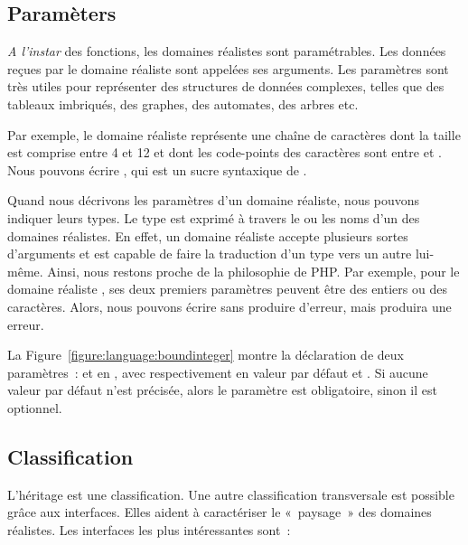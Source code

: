\subsection{Paramèters}
\label{subsection:language:realdom:parameters}

{\em A l'instar} des fonctions, les domaines réalistes sont {\strong
paramétrables}.  Les données reçues par le domaine réaliste sont appelées ses
{\strong arguments}. Les paramètres sont très utiles pour représenter des
structures de données complexes, telles que des tableaux imbriqués, des graphes,
des automates, des arbres etc.

\begin{example}

Par exemple, le domaine réaliste 
représente une chaîne de caractères dont la taille est comprise entre 4 et 12 et
dont les code-points des caractères sont entre  et . Nous
pouvons écrire , qui est un sucre syntaxique de
.

\end{example}

Quand nous décrivons les paramètres d'un domaine réaliste, nous pouvons indiquer
leurs types. Le type est exprimé à travers le ou les noms d'un des domaines
réalistes. En effet, un domaine réaliste accepte plusieurs sortes d'arguments et
est capable de faire la traduction d'un type vers un autre lui-même. Ainsi, nous
restons proche de la philosophie de PHP. Par exemple, pour le domaine réaliste
, ses deux premiers paramètres peuvent être des entiers ou des
caractères. Alors, nous pouvons écrire  sans
produire d'erreur, mais  produira une erreur.

La Figure~\ref{figure:language:boundinteger} montre la déclaration de deux
paramètres~:  et  en , avec respectivement en
valeur par défaut  et . Si aucune valeur
par défaut n'est précisée, alors le paramètre est {\strong obligatoire}, sinon
il est {\strong optionnel}.

\subsection{Classification}
\label{subsection:language:realdom:classification}

L'héritage est une classification. Une autre classification {\strong
transversale} est possible grâce aux {\strong interfaces}. Elles aident à
caractériser le «~paysage~» des domaines réalistes. Les interfaces les plus
intéressantes sont~:

